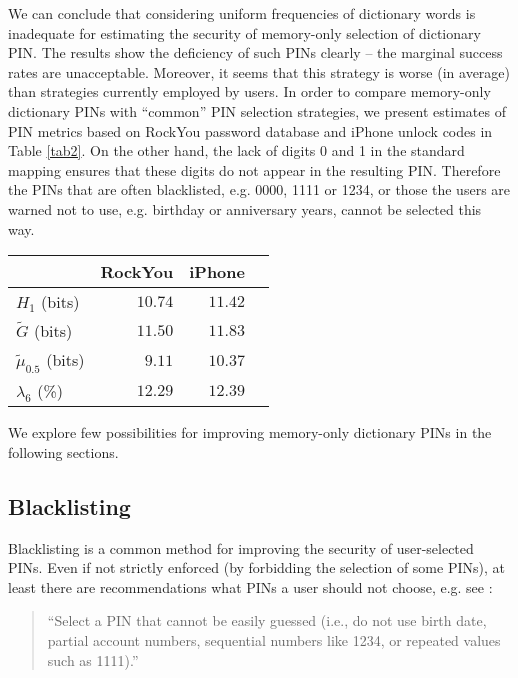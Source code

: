\documentclass[a4paper, 11pt]{article}
\newcommand{\ra}[1]{\renewcommand{\arraystretch}{#1}}
\begin{document}
We can conclude that considering uniform frequencies of dictionary words is inadequate for estimating the security of memory-only
selection of dictionary PIN. The results show the deficiency of such PINs clearly -- the marginal success
rates are unacceptable. Moreover, it seems that this strategy is worse (in average) than strategies currently employed by
users. In order to compare memory-only dictionary PINs with ``common'' PIN selection strategies, we present estimates 
of PIN metrics based on RockYou password database and iPhone unlock codes \cite{BPA12} in Table \ref{tab2}.
On the other hand, the lack of digits 0 and 1 in the standard mapping ensures that these digits do not appear in the 
resulting PIN. Therefore the PINs that are often blacklisted, e.g. 0000, 1111 or 1234, or those the users are warned not to 
use, e.g. birthday or anniversary years, cannot be selected this way.

\begin{table*}[h]\centering
\ra{1.2}
\begin{tabular}{@{}lrrr@{}}\toprule
 & RockYou & iPhone \\
 \midrule
$H_1$ (bits)       & $10.74$ & $11.42$ \\
$\tilde G$  (bits) & $11.50$ & $11.83$ \\
$\tilde \mu_{0.5}$ (bits) & $9.11$ & $10.37$ \\
$\lambda_{6}$ (\%) & $12.29$ & $12.39$ \\
\bottomrule
\end{tabular}
\caption{Estimation of PIN metrics (PIN length 4) \cite{BPA12}}\label{tab2}
\end{table*}

We explore few possibilities for improving memory-only dictionary PINs in the following sections.


\subsection{Blacklisting}

Blacklisting is a common method for improving the security of user-selected PINs. Even if not strictly enforced
(by forbidding the selection of some PINs), at least there are recommendations what PINs a user should not
choose, e.g. see \cite{VISA}:

\begin{quote}
``Select a PIN that cannot be easily guessed (i.e., do not use birth date, 
partial account numbers, sequential numbers like 1234, or repeated 
values such as 1111).''
\end{quote}
\end{document}
